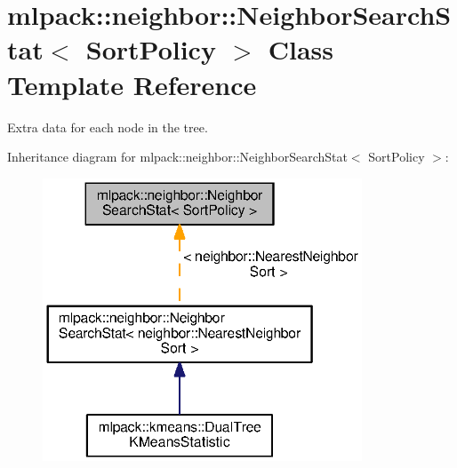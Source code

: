 \section{mlpack\+:\+:neighbor\+:\+:Neighbor\+Search\+Stat$<$ Sort\+Policy $>$ Class Template Reference}
\label{classmlpack_1_1neighbor_1_1NeighborSearchStat}


Extra data for each node in the tree.  




Inheritance diagram for mlpack\+:\+:neighbor\+:\+:Neighbor\+Search\+Stat$<$ Sort\+Policy $>$\+:
\nopagebreak
\begin{figure}[H]
\begin{center}
\leavevmode
\includegraphics[width=269pt]{classmlpack_1_1neighbor_1_1NeighborSearchStat__inherit__graph}
\end{center}
\end{figure}
